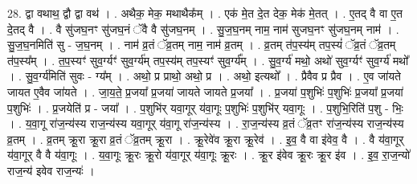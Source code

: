 \documentclass[17pt]{extarticle}
\begin{document}
28. द्वा वथाथ॒ द्वौ द्वा वथ॑ । . अथैक॒ मेक॒ मथाथैक᳚म् । . एक॑ मे॒त दे॒त देक॒ मेक॑ मे॒तत् । . ए॒तद् वै वा ए॒त दे॒तद् वै । . वै सु॑जघ॒नꣳ सु॑जघ॒नं ॅवै वै सु॑जघ॒नम् । . सु॒ज॒घ॒नम् नाम॒ नाम॑ सुजघ॒नꣳ सु॑जघ॒नम् नाम॑ । . सु॒ज॒घ॒नमिति॑ सु - ज॒घ॒नम् । . नाम॑ व्र॒तं ॅव्र॒तम् नाम॒ नाम॑ व्र॒तम् । . व्र॒तम् त॑प॒स्य॑म् तप॒स्यं॑ ॅव्र॒तं ॅव्र॒तम् त॑प॒स्य᳚म् । . त॒प॒स्यꣳ॑ सुव॒र्ग्यꣳ॑ सुव॒र्ग्य॑म् तप॒स्य॑म् तप॒स्यꣳ॑ सुव॒र्ग्य᳚म् । . सु॒व॒र्ग्य॑ मथो॒ अथो॑ सुव॒र्ग्यꣳ॑ सुव॒र्ग्य॑ मथो᳚ । . सु॒व॒र्ग्य॑मिति॑ सुवः - ग्य᳚म् । . अथो॒ प्र प्राथो॒ अथो॒ प्र । . अथो॒ इत्यथो᳚ । . प्रैवैव प्र प्रैव । . ए॒व जा॑यते जायत ए॒वैव जा॑यते । . जा॒य॒ते॒ प्र॒जया᳚ प्र॒जया॑ जायते जायते प्र॒जया᳚ । . प्र॒जया॑ प॒शुभिः॑ प॒शुभिः॑ प्र॒जया᳚ प्र॒जया॑ प॒शुभिः॑ । . प्र॒जयेति॑ प्र - जया᳚ । . प॒शुभि॑र् यवा॒गूर् य॑वा॒गूः प॒शुभिः॑ प॒शुभि॑र् यवा॒गूः । . प॒शुभि॒रिति॑ प॒शु - भिः॒ । . य॒वा॒गू रा॑ज॒न्य॑स्य राज॒न्य॑स्य यवा॒गूर् य॑वा॒गू रा॑ज॒न्य॑स्य । . रा॒ज॒न्य॑स्य व्र॒तं ॅव्र॒तꣳ रा॑ज॒न्य॑स्य राज॒न्य॑स्य व्र॒तम् । . व्र॒तम् क्रू॒रा क्रू॒रा व्र॒तं ॅव्र॒तम् क्रू॒रा । . क्रू॒रेवे॑व क्रू॒रा क्रू॒रेव॑ । . इ॒व॒ वै वा इ॑वेव॒ वै । . वै य॑वा॒गूर् य॑वा॒गूर् वै वै य॑वा॒गूः । . य॒वा॒गूः क्रू॒रः क्रू॒रो य॑वा॒गूर् य॑वा॒गूः क्रू॒रः । . क्रू॒र इ॑वेव क्रू॒रः क्रू॒र इ॑व । . इ॒व॒ रा॒ज॒न्यो॑ राज॒न्य॑ इवेव राज॒न्यः॑ । \newline
\end{document}
